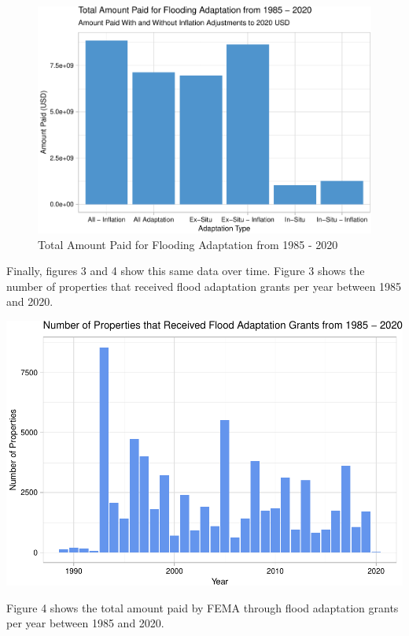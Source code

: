 \documentclass[
  12pt,
]{article}
\begin{document}
\begin{figure}
\centering
\includegraphics{finalreport_files/figure-latex/unnamed-chunk-7-1.pdf}
\caption{Total Amount Paid for Flooding Adaptation from 1985 - 2020}
\end{figure}

Finally, figures 3 and 4 show this same data over time. Figure 3 shows
the number of properties that received flood adaptation grants per year
between 1985 and 2020. \newline

\includegraphics{finalreport_files/figure-latex/unnamed-chunk-8-1.pdf}
\newpage

Figure 4 shows the total amount paid by FEMA through flood adaptation
grants per year between 1985 and 2020. \newline
\end{document}

